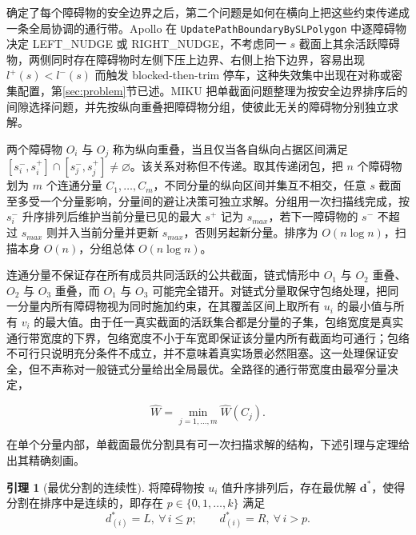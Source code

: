 \documentclass[a4paper,zihao=5]{ctexart}
\theoremstyle{definition}
\newtheorem{lemma}{引理}[section]
\begin{document}
确定了每个障碍物的安全边界之后，第二个问题是如何在横向上把这些约束传递成一条全局协调的通行带。Apollo 在 \texttt{UpdatePathBoundaryBySLPolygon} 中逐障碍物决定 LEFT\_NUDGE 或 RIGHT\_NUDGE，不考虑同一 $s$ 截面上其余活跃障碍物，两侧同时存在障碍物时左侧下压上边界、右侧上抬下边界，容易出现 $l^{+}(s)<l^{-}(s)$ 而触发 blocked-then-trim 停车，这种失效集中出现在对称或密集配置，第\ref{sec:problem}节已述。MIKU 把单截面问题整理为按安全边界排序后的间隙选择问题，并先按纵向重叠把障碍物分组，使彼此无关的障碍物分别独立求解。

两个障碍物 $O_i$ 与 $O_j$ 称为纵向重叠，当且仅当各自纵向占据区间满足 $[s_i^{-}, s_i^{+}] \cap [s_j^{-}, s_j^{+}] \neq \varnothing$。该关系对称但不传递。取其传递闭包，把 $n$ 个障碍物划为 $m$ 个连通分量 $C_1, \ldots, C_m$，不同分量的纵向区间并集互不相交，任意 $s$ 截面至多受一个分量影响，分量间的避让决策可独立求解。分组用一次扫描线完成，按 $s_i^{-}$ 升序排列后维护当前分量已见的最大 $s^{+}$ 记为 $s_{max}$，若下一障碍物的 $s^{-}$ 不超过 $s_{max}$ 则并入当前分量并更新 $s_{max}$，否则另起新分量。排序为 $O(n\log n)$，扫描本身 $O(n)$，分组总体 $O(n\log n)$。

连通分量不保证存在所有成员共同活跃的公共截面，链式情形中 $O_1$ 与 $O_2$ 重叠、$O_2$ 与 $O_3$ 重叠，而 $O_1$ 与 $O_3$ 可能完全错开。对链式分量取保守包络处理，把同一分量内所有障碍物视为同时施加约束，在其覆盖区间上取所有 $u_i$ 的最小值与所有 $v_i$ 的最大值。由于任一真实截面的活跃集合都是分量的子集，包络宽度是真实通行带宽度的下界，包络宽度不小于车宽即保证该分量内所有截面均可通行；包络不可行只说明充分条件不成立，并不意味着真实场景必然阻塞。这一处理保证安全，但不声称对一般链式分量给出全局最优。全路径的通行带宽度由最窄分量决定，

\begin{equation}
    \hat{W} = \min_{j=1,\ldots,m} \hat{W}(C_j).
    \label{eq:global_width}
\end{equation}

在单个分量内部，单截面最优分割具有可一次扫描求解的结构，下述引理与定理给出其精确刻画。

\begin{lemma}[最优分割的连续性]
\label{lem:continuous_partition}
将障碍物按 $u_i$ 值升序排列后，存在最优解 $\mathbf{d}^{*}$，使得分割在排序中是连续的，即存在 $p \in \{0, 1, \ldots, k\}$ 满足
\begin{equation}
    d_{(i)}^{*} = L,\ \forall\, i \leq p; \qquad d_{(i)}^{*} = R,\ \forall\, i > p.
    \label{eq:continuous_partition}
\end{equation}
\end{lemma}
\end{document}
